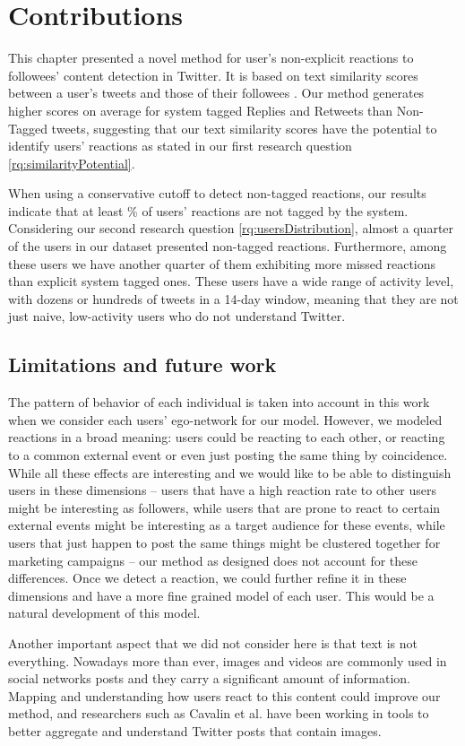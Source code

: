 \section{Contributions}

This chapter presented a novel method for user's non-explicit reactions to followees' content detection in Twitter. It is based on text similarity scores between a user's tweets and those of their followees \cite{Barbosa}.  Our method generates higher scores on average for system tagged Replies and Retweets than Non-Tagged tweets, suggesting that our text similarity scores have the potential to identify users' reactions as stated in our first research question \ref{rq:similarityPotential}.  

When using a conservative cutoff to detect non-tagged reactions, our results indicate that at least \highNonTaggedTweetCountPct{}\% of users' reactions are not tagged by the system.  Considering our second research question \ref{rq:usersDistribution}, almost a quarter of the users in our dataset presented non-tagged reactions. Furthermore, among these users we have another quarter of them exhibiting more missed reactions than explicit system tagged ones. These users have a wide range of activity level, with dozens or hundreds of tweets in a 14-day window, meaning that they are not just naive, low-activity users who do not understand Twitter.

\subsection{Limitations and future work}

The pattern of behavior of each individual is taken into account in this work when we consider each users' ego-network for our model. However, we modeled reactions in a broad meaning: users could be reacting to each other, or reacting to a common external event or even just posting the same thing by coincidence. While all these effects are interesting and we would like to be able to distinguish users in these dimensions -- users that have a high reaction rate to other users might be interesting as followers, while users that are prone to react to certain external events might be interesting as a target audience for these events, while users that just happen to post the same things might be clustered together for marketing campaigns -- our method as designed does not account for these differences. Once we detect a reaction, we could further refine it in these dimensions and have a more fine grained model of each user. This would be a natural development of this model.

Another important aspect that we did not consider here is that text is not everything. Nowadays more than ever, images and videos are commonly used in social networks posts and they carry a significant amount of information. Mapping and understanding how users react to this content could improve our method, and researchers such as Cavalin et al. \cite{Cavalin2016} have been working in tools to better aggregate and understand Twitter posts that contain images.

